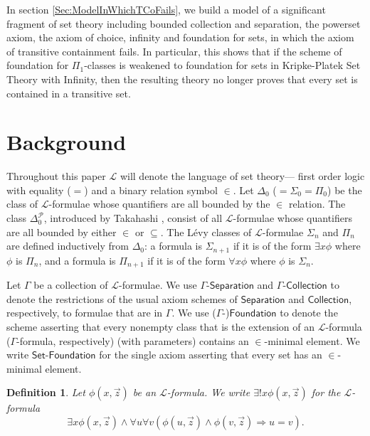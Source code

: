 \documentclass[11pt, a4paper]{article}
\newcounter{Def1}
\newcounter{Theor1}
\newtheorem{definition}[theorem]{Definition}
\begin{document}
In section \ref{Sec:ModelInWhichTCoFails}, we build a model of a significant fragment of set theory including bounded collection and separation, the powerset axiom, the axiom of choice, infinity and foundation for sets, in which the axiom of transitive containment fails. In particular, this shows that if the scheme of foundation for $\Pi_1$-classes is weakened to foundation for sets in Kripke-Platek Set Theory with Infinity, then the resulting theory no longer proves that every set is contained in a transitive set.


\section[Background]{Background}

Throughout this paper $\mathcal{L}$ will denote the language of set theory--- first order logic with equality ($=$) and a binary relation symbol $\in$. Let $\Delta_0$ ($=\Sigma_0=\Pi_0$) be the class of $\mathcal{L}$-formulae whose quantifiers are all bounded by the $\in$ relation. The class $\Delta_0^{\mathcal{P}}$, introduced by Takahashi \cite{tak72}, consist of all $\mathcal{L}$-formulae whose quantifiers are all bounded by either $\in$ or $\subseteq$. The L\'{e}vy classes of $\mathcal{L}$-formulae $\Sigma_n$ and $\Pi_n$ are defined inductively from $\Delta_0$: a formula is $\Sigma_{n+1}$ if it is of the form $\exists x \phi$ where $\phi$ is $\Pi_n$, and a formula is $\Pi_{n+1}$ if it is of the form $\forall x \phi$ where $\phi$ is $\Sigma_n$.

Let $\Gamma$ be a collection of $\mathcal{L}$-formulae. We use $\Gamma\textsf{-Separation}$ and $\Gamma\textsf{-Collection}$ to denote the restrictions of the usual axiom schemes of $\textsf{Separation}$ and $\textsf{Collection}$, respectively, to formulae that are in $\Gamma$. We use ($\Gamma$-)$\textsf{Foundation}$ to denote the scheme asserting that every nonempty class that is the extension of an $\mathcal{L}$-formula ($\Gamma$-formula, respectively) (with parameters) contains an $\in$-minimal element. We write $\textsf{Set-Foundation}$ for the single axiom asserting that every set has an $\in$-minimal element. 

\begin{definition}
Let $\phi(x, \vec{z})$ be an $\mathcal{L}$-formula. We write $\exists ! x \phi(x, \vec{z})$ for the $\mathcal{L}$-formula
\[
\exists x \phi(x, \vec{z}) \land \forall u \forall v (\phi(u, \vec{z}) \land \phi(v, \vec{z}) \Rightarrow u =v).
\]
\end{definition}
\end{document}
